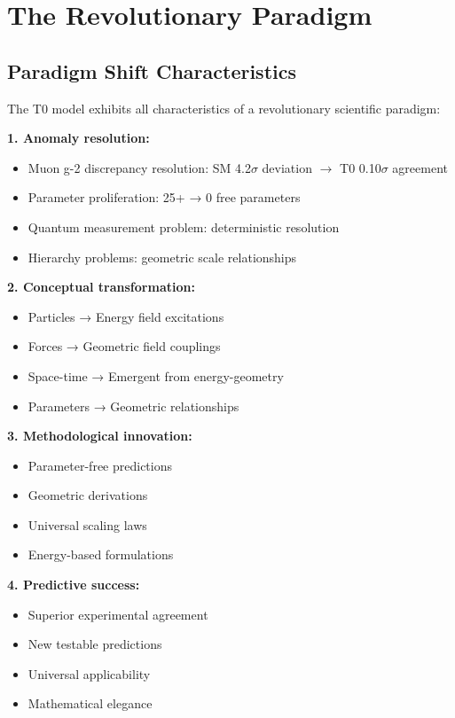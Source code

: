 \documentclass[12pt,a4paper]{report}
\begin{document}
\section{The Revolutionary Paradigm}
\label{sec:revolutionary_paradigm}

\subsection{Paradigm Shift Characteristics}
\label{subsec:paradigm_shift_characteristics}

The T0 model exhibits all characteristics of a revolutionary scientific paradigm:

\textbf{1. Anomaly resolution:}
\begin{itemize}
	\item Muon g-2 discrepancy resolution: SM 4.2$\sigma$ deviation $\rightarrow$ T0 0.10$\sigma$ agreement
	\item Parameter proliferation: 25+ → 0 free parameters
	\item Quantum measurement problem: deterministic resolution
	\item Hierarchy problems: geometric scale relationships
\end{itemize}

\textbf{2. Conceptual transformation:}
\begin{itemize}
	\item Particles → Energy field excitations
	\item Forces → Geometric field couplings
	\item Space-time → Emergent from energy-geometry
	\item Parameters → Geometric relationships
\end{itemize}

\textbf{3. Methodological innovation:}
\begin{itemize}
	\item Parameter-free predictions
	\item Geometric derivations
	\item Universal scaling laws
	\item Energy-based formulations
\end{itemize}

\textbf{4. Predictive success:}
\begin{itemize}
	\item Superior experimental agreement
	\item New testable predictions
	\item Universal applicability
	\item Mathematical elegance
\end{itemize}
\end{document}
